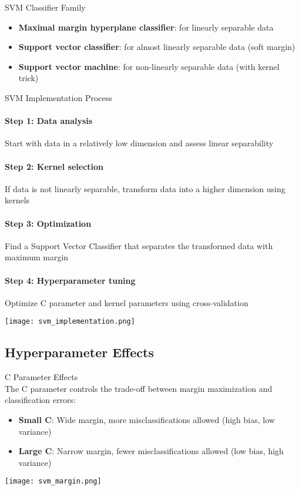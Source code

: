 \begin{concept}{SVM Classifier Family}
\begin{itemize}
    \item \textbf{Maximal margin hyperplane classifier}: for linearly separable data
    \item \textbf{Support vector classifier}: for almost linearly separable data (soft margin)
    \item \textbf{Support vector machine}: for non-linearly separable data (with kernel trick)
\end{itemize}
\end{concept}

\begin{KR}{SVM Implementation Process}
\paragraph{Step 1: Data analysis}
Start with data in a relatively low dimension and assess linear separability

\paragraph{Step 2: Kernel selection}
If data is not linearly separable, transform data into a higher dimension using kernels

\paragraph{Step 3: Optimization}
Find a Support Vector Classifier that separates the transformed data with maximum margin

\paragraph{Step 4: Hyperparameter tuning}
Optimize C parameter and kernel parameters using cross-validation
\end{KR}

\texttt{[image: svm\_implementation.png]}

\subsection{Hyperparameter Effects}

\begin{concept}{C Parameter Effects}\\
The C parameter controls the trade-off between margin maximization and classification errors:
\begin{itemize}
    \item \textbf{Small C}: Wide margin, more misclassifications allowed (high bias, low variance)
    \item \textbf{Large C}: Narrow margin, fewer misclassifications allowed (low bias, high variance)
\end{itemize}
\end{concept}

\texttt{[image: svm\_margin.png]}